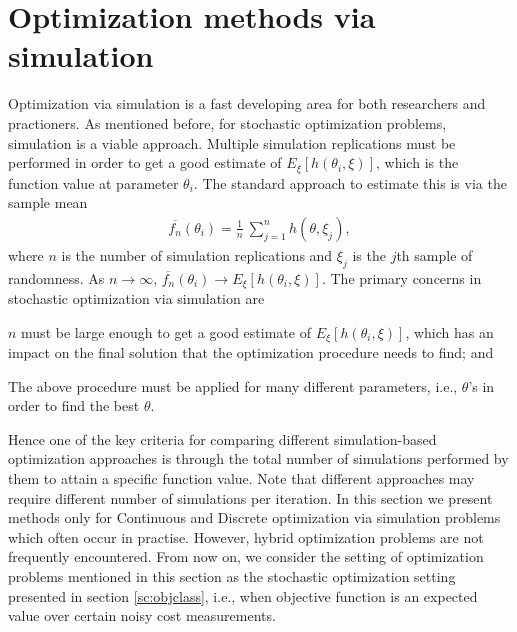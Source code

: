 \section{Optimization methods via simulation }\label{sc:dis}
Optimization via simulation is a fast developing area for both researchers and practioners. As mentioned before, for stochastic optimization problems, simulation is a viable approach. Multiple simulation replications must be performed in order to get a good estimate of $E_{\xi}[h(\theta_i,\xi)]$, which is the function value at parameter $\theta_i$. The standard approach to estimate this is via the sample mean
\begin{align}\label{eq:sm}
\overline {f_n} (\theta_i) = \frac{1}{n} ~  \sum_{j=1}^{n} h(\theta,\xi_j),
\end{align}
where $n$ is the number of simulation replications and $\xi_j$ is the $j$th sample of randomness. As $n \to \infty$, $\overline{ f_n} (\theta_i) \to E_{\xi}[h(\theta_i,\xi)]$. The primary concerns in stochastic optimization via simulation are 
\begin{inparaenum}[\bfseries (i)]
	\item $n$ must be large enough to get a good estimate of  $E_{\xi}[h(\theta_i,\xi)]$, which has an impact on the final solution that the optimization procedure needs to find; and
	\item The above procedure must be applied for many different parameters, i.e., $\theta$'s in order to find the best $\theta$.
\end{inparaenum}
Hence one of the key criteria for comparing different simulation-based optimization approaches is through the total number of simulations performed by them to attain a specific function value. Note that different approaches may require different number of simulations per  iteration. In this section we present methods only for Continuous and Discrete optimization via simulation problems which often occur in practise. However, hybrid optimization problems are not frequently encountered. From  now on, we consider the setting of optimization problems mentioned in this section as the stochastic optimization setting presented in section \ref{sc:objclass}, i.e., when objective function is an expected value over certain noisy cost measurements. 
